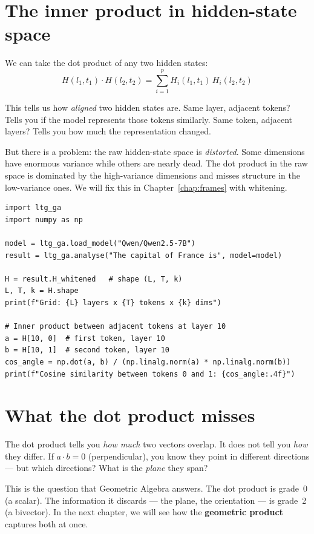 \documentclass[11pt, twoside, openright]{memoir}
\newcommand{\ip}{\cdot}           %
\begin{document}
\section{The inner product in hidden-state space}

We can take the dot product of any two hidden states:
\[
  H(l_1, t_1) \ip H(l_2, t_2) = \sum_{i=1}^{p} H_i(l_1, t_1) \, H_i(l_2, t_2)
\]

This tells us how \emph{aligned} two hidden states are.  Same layer,
adjacent tokens?  Tells you if the model represents those tokens
similarly.  Same token, adjacent layers?  Tells you how much the
representation changed.

But there is a problem: the raw hidden-state space is \emph{distorted}.
Some dimensions have enormous variance while others are nearly dead.
The dot product in the raw space is dominated by the high-variance
dimensions and misses structure in the low-variance ones.  We will fix
this in Chapter~\ref{chap:frames} with whitening.

\begin{lstlisting}[caption={Extracting hidden states and measuring inner products}]
import ltg_ga
import numpy as np

model = ltg_ga.load_model("Qwen/Qwen2.5-7B")
result = ltg_ga.analyse("The capital of France is", model=model)

H = result.H_whitened   # shape (L, T, k)
L, T, k = H.shape
print(f"Grid: {L} layers x {T} tokens x {k} dims")

# Inner product between adjacent tokens at layer 10
a = H[10, 0]  # first token, layer 10
b = H[10, 1]  # second token, layer 10
cos_angle = np.dot(a, b) / (np.linalg.norm(a) * np.linalg.norm(b))
print(f"Cosine similarity between tokens 0 and 1: {cos_angle:.4f}")
\end{lstlisting}

\section{What the dot product misses}

The dot product tells you \emph{how much} two vectors overlap.  It does
not tell you \emph{how} they differ.  If $a \ip b = 0$ (perpendicular),
you know they point in different directions --- but which directions?
What is the \emph{plane} they span?

This is the question that Geometric Algebra answers.  The dot product is
grade~0 (a scalar).  The information it discards --- the plane, the
orientation --- is grade~2 (a bivector).  In the next chapter, we will
see how the \textbf{geometric product} captures both at once.
\end{document}
